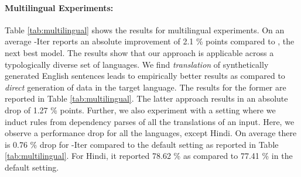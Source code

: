 



\paragraph{Multilingual Experiments:}  Table \ref{tab:multilingual} shows the results for multilingual experiments. %
On an average \our-Iter reports an absolute improvement of 2.1 \% points compared to \our, the next best model. The results show that our approach is applicable across a typologically diverse set of languages. We find \textit{translation} of synthetically generated English sentences leads to empirically better results as compared to \textit{direct} generation of data in the target language. The results for the former are reported in Table \ref{tab:multilingual}.  The latter approach results in an absolute  drop of 1.27 \% points. Further, we also experiment with a setting where we induct rules from dependency parses of all the translations of an input. Here, we observe a performance drop for all the languages, except Hindi. On average there is 0.76 \% drop for \our-Iter compared to the default setting as reported in Table \ref{tab:multilingual}. For Hindi, it reported 78.62 \% as compared to 77.41 \% in the default setting.

